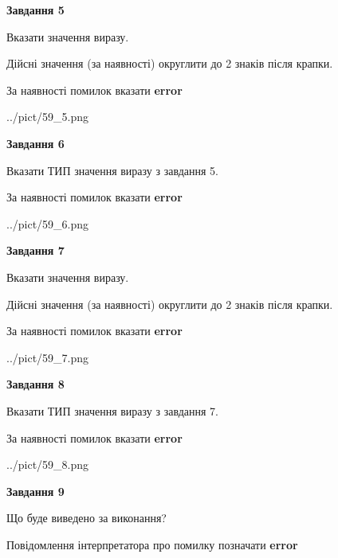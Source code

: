 \documentclass[11pt, ukrainian]{article}
\begin{document}
{\begin {large}
{\begin {center}\textbf{Завдання 5}\end {center}}\par
Вказати значення виразу. \par
Дійсні значення (за наявності) округлити до 2 знаків після крапки. \par
За наявності помилок вказати \textbf{error}

\begin{center}
	{../pict/59_5.png}
\end{center}
\newpage

{\begin {center}\textbf{Завдання 6}\end {center}}\par
Вказати ТИП значення виразу з завдання 5. \par
За наявності помилок вказати \textbf{error}

\begin{center}
	{../pict/59_6.png}
\end{center}
\newpage

{\begin {center}\textbf{Завдання 7}\end {center}}\par
Вказати значення виразу. \par
Дійсні значення (за наявності) округлити до 2 знаків після крапки. \par
За наявності помилок вказати \textbf{error}

\begin{center}
	{../pict/59_7.png}
\end{center}
\newpage

{\begin {center}\textbf{Завдання 8}\end {center}}\par
Вказати ТИП значення виразу з завдання 7. \par
За наявності помилок вказати \textbf{error}

\begin{center}
	{../pict/59_8.png}
\end{center}
\newpage

{\begin {center}\textbf{Завдання 9}\end {center}}\par
Що буде виведено за виконання? \par
Повідомлення інтерпретатора про помилку позначати \textbf{error}


\end{large}}
\end{document}
